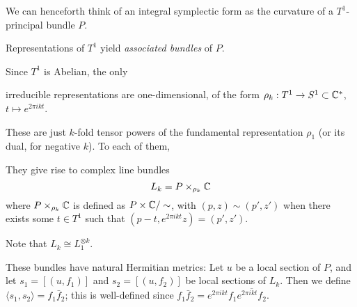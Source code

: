 \documentclass[parskip=half]{scrartcl}
\begin{document}
We can henceforth think of an integral symplectic form as the curvature of a $T^1$-principal bundle $P$. 

\begin{onboard}
Representations of $T^1$ yield \emph{associated bundles} of $P$.
\end{onboard} 
Since $T^1$ is Abelian, the only 
\begin{onboard}
irreducible representations are one-dimensional, of the form $\rho_k: T^1\to S^1\subset \mathbb{C}^*$, $t\mapsto e^{2\pi i k t}$.
\end{onboard} 
These are just $k$-fold tensor powers of the fundamental representation $\rho_1$ (or its dual, for negative $k$). To each of them, 
\begin{onboard}
They give rise to complex line bundles
\begin{equation*}
	L_k=P\times_{\rho_k}\mathbb{C}
\end{equation*}
where $P\times_{\rho_k}\mathbb{C}$ is defined as $P\times \mathbb{C}/\sim$, with $(p,z)\sim (p',z')$ when there exists some $t\in T^1$ such that $(p-t,e^{2\pi ik t}z)=(p',z')$.
\end{onboard} 
Note that $L_k\cong L_1^{\otimes k}$.
\begin{onboard}
These bundles have natural Hermitian metrics: Let $u$ be a local section of $P$, and let $s_1=[(u,f_1)]$ and $s_2=[(u,f_2)]$ be local sections of $L_k$. Then we define $\langle s_1,s_2\rangle=f_1\bar f_2$; this is well-defined since $f_1\bar f_2=e^{2\pi ik t}f_1 \overline{e^{2\pi ikt}f_2}$.
\end{onboard}
\end{document}
